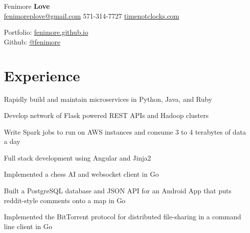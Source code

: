 \documentclass[]{deedy-resume-openfont}
\begin{document}
%
%

%
%
\hspace{-5.5mm}
\begin{minipage}[t]{.6\textwidth}
{\Huge Fenimore {\textbf{Love}}}\\
\href{mailto:fenimoreplove@gmail.com}{fenimoreplove@gmail.com} \textbullet{} 571-314-7727 \textbullet{} \href{https://timenotclocks.com}{timenotclocks.com}\\
\end{minipage}
\hfill
\begin{minipage}[t]{.3\textwidth}
Portfolio: \href{https://fenimore.github.io}{fenimore.github.io}\\
Github: \href{https://github.com/fenimore}{@fenimore}
\end{minipage}
\namesection{}{} %


\section{Experience}
\begin{tightemize}
\item Rapidly build and maintain microservices in Python, Java, and Ruby
\item Develop network of Flask powered REST APIs and Hadoop clusters
\item Write Spark jobs to run on AWS instances and consume 3 to 4 terabytes of data a day
\item Full stack development using Angular and Jinja2
\end{tightemize}
\sectionsep

\begin{tightemize}
\item Implemented a chess AI and websocket client in Go
\item Built a PostgreSQL database and JSON API for an Android App that puts reddit-style comments onto a map in Go
\item Implemented the BitTorrent protocol for distributed file-sharing in a command line client in Go
\end{tightemize}
\sectionsep
\end{document}
